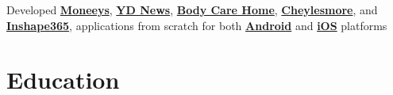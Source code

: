 \documentclass[]{deedy-resume-openfont}
\begin{document}
\begin{minipage}[t]{0.66\textwidth}
\begin{tightemize}
\item Developed \href{https://play.google.com/store/apps/details?id=com.moneeys.io}{\bf Moneeys}, \href{https://play.google.com/store/apps/details?id=com.yesdaida.ydnews&hl=en_IN&gl=US}{\bf YD News}, \href{https://play.google.com/store/apps/details?id=jp.bodycarehome.app}{\bf Body Care Home}, \href{https://play.google.com/store/apps/details?id=com.accountants.cheylesmore&hl=en_IN&gl=US}{\bf Cheylesmore}, and \href{https://play.google.com/store/apps/details?id=com.webglobic.inshape&hl=en_IN&gl=US}{\bf Inshape365}, applications from scratch for both \href{https://play.google.com/store/apps/details?id=jp.bodycarehome.app}{\bf Android} and \href{https://apps.apple.com/us/app/body-care-home/id1577377364?l=ru}{\bf iOS} platforms
\end{tightemize}
\sectionsep








\section{Education} 


\end{minipage}
\end{document}
